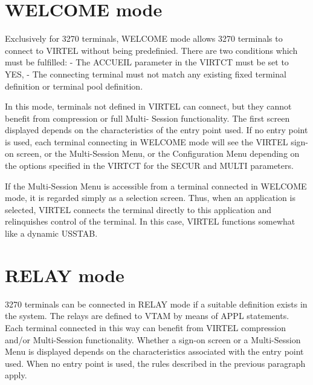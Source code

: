 \documentclass[letterpaper,10pt,english]{sphinxmanual}
\begin{document}
\ignorespaces 

\section{WELCOME mode}
\label{\detokenize{connectivity_guide:welcome-mode}}\label{\detokenize{connectivity_guide:index-136}}
Exclusively for 3270 terminals, WELCOME mode allows 3270 terminals to connect to VIRTEL without being predefinied.
There are two conditions which must be fulfilled:
- The ACCUEIL parameter in the VIRTCT must be set to YES,
- The connecting terminal must not match any existing fixed terminal definition or terminal pool definition.

In this mode, terminals not defined in VIRTEL can connect, but they cannot benefit from compression or full Multi-
Session functionality. The first screen displayed depends on the characteristics of the entry point used. If no entry
point is used, each terminal connecting in WELCOME mode will see the VIRTEL sign-on screen, or the Multi-Session
Menu, or the Configuration Menu depending on the options specified in the VIRTCT for the SECUR and MULTI
parameters.

If the Multi-Session Menu is accessible from a terminal connected in WELCOME mode, it is regarded simply as a
selection screen. Thus, when an application is selected, VIRTEL connects the terminal directly to this application and
relinquishes control of the terminal. In this case, VIRTEL functions somewhat like a dynamic USSTAB.

\ignorespaces 

\section{RELAY mode}
\label{\detokenize{connectivity_guide:relay-mode}}\label{\detokenize{connectivity_guide:index-137}}
3270 terminals can be connected in RELAY mode if a suitable definition exists in the system. The relays are defined to VTAM by means of APPL statements. Each terminal connected in this way can benefit from VIRTEL compression and/or Multi-Session functionality. Whether a sign-on screen or a Multi-Session Menu is displayed depends on the characteristics associated with the entry point used. When no entry point is used, the rules described in the previous paragraph apply.
\end{document}

